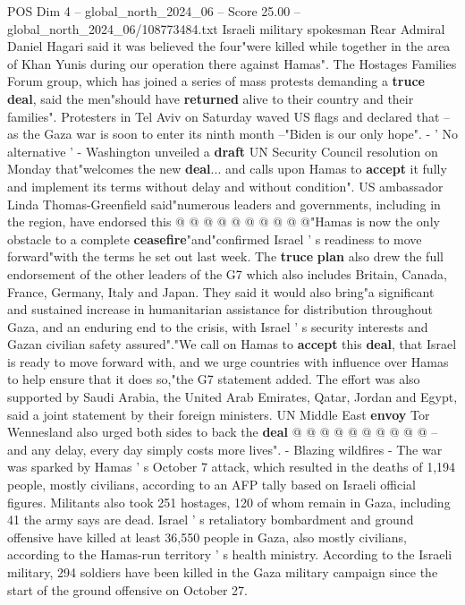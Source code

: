 \begin{textsample}{POS Dim 4 – global\_north\_2024\_06 – Score 25.00 – global\_north\_2024\_06/108773484.txt}
Israeli military spokesman Rear Admiral Daniel Hagari said it was believed the four"were killed while together in the area of Khan Yunis during our operation there against Hamas".
The Hostages Families Forum group, which has joined a series of mass protests demanding a \textbf{truce} \textbf{deal}, said the men"should have \textbf{returned} alive to their country and their families".
Protesters in Tel Aviv on Saturday waved US flags and declared that -- as the Gaza war is soon to enter its ninth month --"Biden is our only hope". - ' No alternative ' - Washington unveiled a \textbf{draft} UN Security Council resolution on Monday that"welcomes the new \textbf{deal}... and calls upon Hamas to \textbf{accept} it fully and implement its terms without delay and without condition".
US ambassador Linda Thomas-Greenfield said"numerous leaders and governments, including in the region, have endorsed this @ @ @ @ @ @ @ @ @ @"Hamas is now the only obstacle to a complete \textbf{ceasefire}"and"confirmed Israel ' s readiness to move forward"with the terms he set out last week.
The \textbf{truce} \textbf{plan} also drew the full endorsement of the other leaders of the G7 which also includes Britain, Canada, France, Germany, Italy and Japan.
They said it would also bring"a significant and sustained increase in humanitarian assistance for distribution throughout Gaza, and an enduring end to the crisis, with Israel ' s security interests and Gazan civilian safety assured"."We call on Hamas to \textbf{accept} this \textbf{deal}, that Israel is ready to move forward with, and we urge countries with influence over Hamas to help ensure that it does so,"the G7 statement added.
The effort was also supported by Saudi Arabia, the United Arab Emirates, Qatar, Jordan and Egypt, said a joint statement by their foreign ministers.
UN Middle East \textbf{envoy} Tor Wennesland also urged both sides to back the \textbf{deal} @ @ @ @ @ @ @ @ @ @ -- and any delay, every day simply costs more lives". - Blazing wildfires - The war was sparked by Hamas ' s October 7 attack, which resulted in the deaths of 1,194 people, mostly civilians, according to an AFP tally based on Israeli official figures.
Militants also took 251 hostages, 120 of whom remain in Gaza, including 41 the army says are dead.
Israel ' s retaliatory bombardment and ground offensive have killed at least 36,550 people in Gaza, also mostly civilians, according to the Hamas-run territory ' s health ministry.
According to the Israeli military, 294 soldiers have been killed in the Gaza military campaign since the start of the ground offensive on October 27.

\end{textsample}
